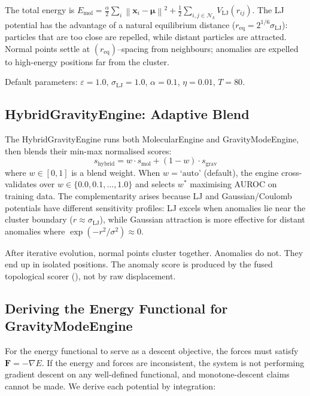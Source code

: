 \documentclass{article}
\newcommand{\norm}[1]{\left\lVert#1\right\rVert}
\begin{document}
The total energy is $E_{\text{mol}} = \frac{\alpha}{2}\sum_i \norm{\mathbf{x}_i - \bm{\mu}}^2 + \frac{1}{2}\sum_{i,j \in \mathcal{N}_k} V_{\text{LJ}}(r_{ij})$. The LJ potential has the advantage of a natural equilibrium distance ($r_{\text{eq}} = 2^{1/6}\sigma_{\text{LJ}}$): particles that are too close are repelled, while distant particles are attracted. Normal points settle at $(r_{\text{eq}})$--spacing from neighbours; anomalies are expelled to high-energy positions far from the cluster.

Default parameters: $\varepsilon = 1.0$, $\sigma_{\text{LJ}} = 1.0$, $\alpha = 0.1$, $\eta = 0.01$, $T = 80$.

\subsection{HybridGravityEngine: Adaptive Blend}
\label{ssec:hybrid_engine}

The HybridGravityEngine runs both MolecularEngine and GravityModeEngine, then blends their min-max normalised scores:
\begin{equation}
s_{\text{hybrid}} = w \cdot s_{\text{mol}} + (1 - w) \cdot s_{\text{grav}}
\label{eq:hybrid}
\end{equation}
where $w \in [0, 1]$ is a blend weight. When $w = \text{`auto'}$ (default), the engine cross-validates over $w \in \{0.0, 0.1, \ldots, 1.0\}$ and selects $w^*$ maximising AUROC on training data. The complementarity arises because LJ and Gaussian/Coulomb potentials have different sensitivity profiles: LJ excels when anomalies lie near the cluster boundary ($r \approx \sigma_{\text{LJ}}$), while Gaussian attraction is more effective for distant anomalies where $\exp(-r^2/\sigma^2) \approx 0$.

After iterative evolution, normal points cluster together. Anomalies do not. They end up in isolated positions. The anomaly score is produced by the fused topological scorer (), not by raw displacement.

\subsection{Deriving the Energy Functional for GravityModeEngine}

For the energy functional to serve as a descent objective, the forces must satisfy $\mathbf{F} = -\nabla E$. If the energy and forces are inconsistent, the system is not performing gradient descent on any well-defined functional, and monotone-descent claims cannot be made. We derive each potential by integration:
\end{document}
